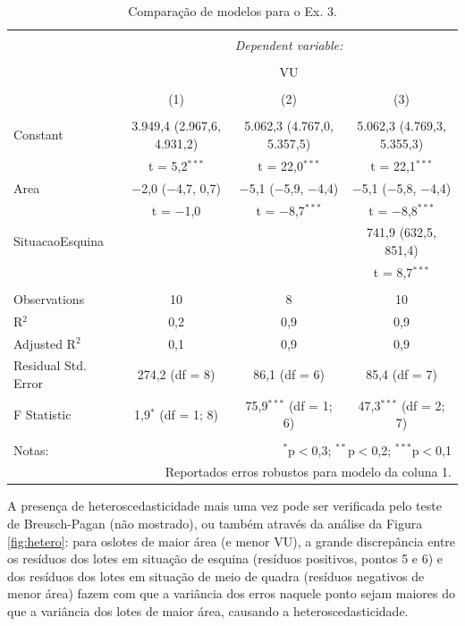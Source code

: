 \documentclass[
  a4paper, 11pt]{article}
\begin{document}
\begin{table}[H] \centering 
  \caption{Comparação de modelos para o Ex. 3.} 
  \label{tab:tab3} 
\footnotesize 
\begin{tabular}{@{\extracolsep{5pt}}lccc} 
\\[-1.8ex]\hline 
\hline \\[-1.8ex] 
 & \multicolumn{3}{c}{\textit{Dependent variable:}} \\ 
\cline{2-4} 
\\[-1.8ex] & \multicolumn{3}{c}{VU} \\ 
\\[-1.8ex] & (1) & (2) & (3)\\ 
\hline \\[-1.8ex] 
 Constant & 3.949,4 (2.967,6, 4.931,2) & 5.062,3 (4.767,0, 5.357,5) & 5.062,3 (4.769,3, 5.355,3) \\ 
  & t = 5,2$^{***}$ & t = 22,0$^{***}$ & t = 22,1$^{***}$ \\ 
  Area & $-$2,0 ($-$4,7, 0,7) & $-$5,1 ($-$5,9, $-$4,4) & $-$5,1 ($-$5,8, $-$4,4) \\ 
  & t = $-$1,0 & t = $-$8,7$^{***}$ & t = $-$8,8$^{***}$ \\ 
  SituacaoEsquina &  &  & 741,9 (632,5, 851,4) \\ 
  &  &  & t = 8,7$^{***}$ \\ 
 \hline \\[-1.8ex] 
Observations & 10 & 8 & 10 \\ 
R$^{2}$ & 0,2 & 0,9 & 0,9 \\ 
Adjusted R$^{2}$ & 0,1 & 0,9 & 0,9 \\ 
Residual Std. Error & 274,2 (df = 8) & 86,1 (df = 6) & 85,4 (df = 7) \\ 
F Statistic & 1,9$^{*}$ (df = 1; 8) & 75,9$^{***}$ (df = 1; 6) & 47,3$^{***}$ (df = 2; 7) \\ 
\hline 
\hline \\[-1.8ex] 
Notas: & \multicolumn{3}{r}{$^{*}$p$<$0,3; $^{**}$p$<$0,2; $^{***}$p$<$0,1} \\ 
 & \multicolumn{3}{r}{Reportados erros robustos para modelo da coluna 1.} \\ 
\end{tabular} 
\end{table}

A presença de heteroscedasticidade mais uma vez pode ser verificada pelo
teste de Breusch-Pagan (não mostrado), ou também através da análise da
Figura \ref{fig:hetero}: para oslotes de maior área (e menor VU), a
grande discrepância entre os resíduos dos lotes em situação de esquina
(resíduos positivos, pontos 5 e 6) e dos resíduos dos lotes em situação
de meio de quadra (resíduos negativos de menor área) fazem com que a
variância dos erros naquele ponto sejam maiores do que a variância dos
lotes de maior área, causando a heteroscedasticidade.
\end{document}

